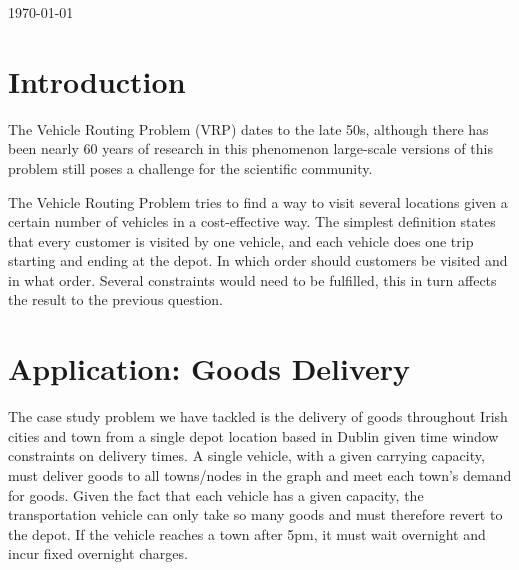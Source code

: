 \documentclass[a4paper,11pt]{article}
\begin{document}
\begin{titlepage}
{\large \today}\\[3cm] %


 

\vfill %

\end{titlepage}

\section{Introduction}

The Vehicle Routing Problem (VRP) dates to the late 50s, although there has been nearly 60 years of research in this phenomenon large-scale versions of this problem still poses a challenge for the scientific community. 

The Vehicle Routing Problem tries to find a way to visit several locations given a certain number of vehicles in a cost-effective way. The simplest definition states that every customer is visited by one vehicle, and each vehicle does one trip starting and ending at the depot. In which order should customers be visited and in what order. Several constraints would need to be fulfilled, this in turn affects the result to the previous question. 

\section{Application: Goods Delivery}

The case study problem we have tackled is the delivery of goods throughout Irish cities and town from a single depot location based in Dublin given time window constraints on delivery times. A single vehicle, with a given carrying capacity, must deliver goods to all towns/nodes in the graph and meet each town's demand for goods. Given the fact that each vehicle has a given capacity, the transportation vehicle can only take so many goods and must therefore revert to the depot. If the vehicle reaches a town after 5pm, it must wait overnight and incur fixed overnight charges.
\end{document}

